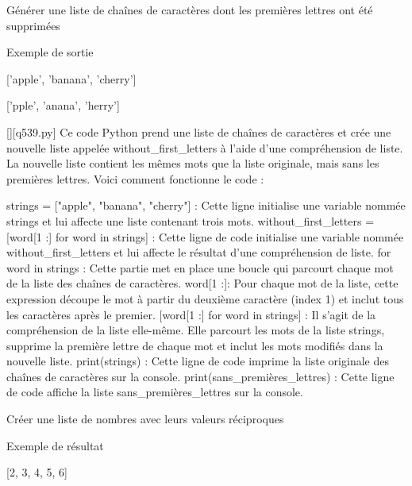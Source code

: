         \question
        Générer une liste de chaînes de caractères dont les premières lettres ont été supprimées

Exemple de sortie

['apple', 'banana', 'cherry']

['pple', 'anana', 'herry']
        \par
        \begin{solution}
            \renewcommand{\nomfichier}{q539.py}
            \pythonfile{\chemincode \nomfichier}[][\nomfichier]
            Ce code Python prend une liste de chaînes de caractères et crée une nouvelle liste appelée without\_first\_letters à l'aide d'une compréhension de liste. La nouvelle liste contient les mêmes mots que la liste originale, mais sans les premières lettres. Voici comment fonctionne le code :

    strings = ["apple", "banana", "cherry"] : Cette ligne initialise une variable nommée strings et lui affecte une liste contenant trois mots.
    without\_first\_letters = [word[1 :] for word in strings] : Cette ligne de code initialise une variable nommée without\_first\_letters et lui affecte le résultat d'une compréhension de liste.
        for word in strings : Cette partie met en place une boucle qui parcourt chaque mot de la liste des chaînes de caractères.
        word[1 :]: Pour chaque mot de la liste, cette expression découpe le mot à partir du deuxième caractère (index 1) et inclut tous les caractères après le premier.
        [word[1 :] for word in strings] : Il s'agit de la compréhension de la liste elle-même. Elle parcourt les mots de la liste strings, supprime la première lettre de chaque mot et inclut les mots modifiés dans la nouvelle liste.
    print(strings) : Cette ligne de code imprime la liste originale des chaînes de caractères sur la console.
    print(sans\_premières\_lettres) : Cette ligne de code affiche la liste sans\_premières\_lettres sur la console.
        \end{solution}
        

        \question
        Créer une liste de nombres avec leurs valeurs réciproques

Exemple de résultat

[2, 3, 4, 5, 6]

